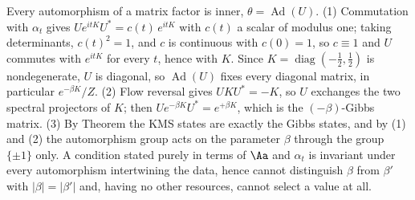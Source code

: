 Every automorphism of a matrix factor is inner, $\theta = \operatorname{Ad}(U)$. (1) Commutation with $\alpha_t$ gives $U e^{itK}U^{*} = c(t)\,e^{itK}$ with $c(t)$ a scalar of modulus one; taking determinants, $c(t)^{2} = 1$, and $c$ is continuous with $c(0) = 1$, so $c \equiv 1$ and $U$ commutes with $e^{itK}$ for every $t$, hence with $K$. Since $K = \operatorname{diag}(-\tfrac12, \tfrac12)$ is nondegenerate, $U$ is diagonal, so $\operatorname{Ad}(U)$ fixes every diagonal matrix, in particular $e^{-\beta K}/Z$. (2) Flow reversal gives $UKU^{*} = -K$, so $U$ exchanges the two spectral projectors of $K$; then $U e^{-\beta K}U^{*} = e^{+\beta K}$, which is the $(-\beta)$-Gibbs matrix. (3) By Theorem  the KMS states are exactly the Gibbs states, and by (1) and (2) the automorphism group acts on the parameter $\beta$ through the group $\{\pm 1\}$ only. A condition stated purely in terms of $\Aa$ and $\alpha_t$ is invariant under every automorphism intertwining the data, hence cannot distinguish $\beta$ from $\beta'$ with $|\beta| = |\beta'|$ and, having no other resources, cannot select a value at all.
